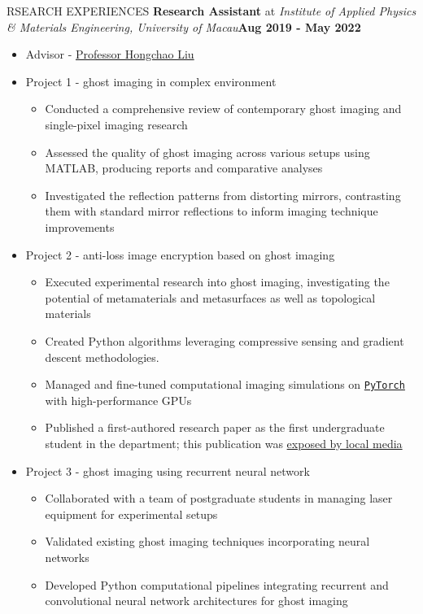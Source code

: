 \documentclass[10pt]{article} %
\begin{document}
\begin{section}{RSEARCH EXPERIENCES}
\textbf{Research Assistant} at \textit{Institute of Applied Physics \& Materials Engineering, University of Macau}\hfill \textbf{Aug 2019 - May 2022} 
\begin{itemize}[leftmargin=1.5em]
    \item Advisor - \href{mailto:hcliu@um.edu.mo}{Professor Hongchao Liu}
    \item Project 1 - ghost imaging in complex environment %
    \begin{itemize}[leftmargin=1.5em]
        \item Conducted a comprehensive review of contemporary ghost imaging and single-pixel imaging research
        \item Assessed the quality of ghost imaging across various setups using MATLAB, producing reports and comparative analyses
        \item Investigated the reflection patterns from distorting mirrors, contrasting them with standard mirror reflections to inform imaging technique improvements
    \end{itemize}
    \item Project 2 - anti-loss image encryption based on ghost imaging %
    \begin{itemize}[leftmargin=1.5em]
        \item Executed experimental research into ghost imaging, investigating the potential of metamaterials and metasurfaces as well as topological materials
        \item Created Python algorithms leveraging compressive sensing and gradient descent methodologies.
        \item Managed and fine-tuned computational imaging simulations on \href{https://pytorch.org/}{\texttt{PyTorch}} with high-performance GPUs
        \item Published a first-authored research paper as the first undergraduate student in the department; this publication was \href{https://www.tdm.com.mo/en/news-detail/683438?isvideo=false&lang=en&category=all}{ exposed by local media} 
    \end{itemize}
    \item Project 3 - ghost imaging using recurrent neural network %
    \begin{itemize}[leftmargin=1.5em]
        \item Collaborated with a team of postgraduate students in managing laser equipment for experimental setups
        \item Validated existing ghost imaging techniques incorporating neural networks
        \item Developed Python computational pipelines integrating recurrent and convolutional neural network architectures for ghost imaging
    \end{itemize}
\end{itemize}

\end{section}
\end{document}

